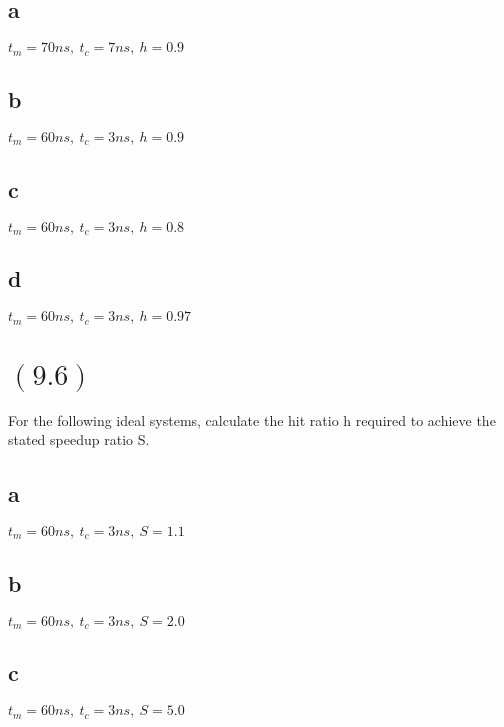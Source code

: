 \documentclass[letterpaper,12pt,titlepage]{article}
\begin{document}
\subsection*{a} $t_m=70ns,~t_c=7ns,~h=0.9$
\begin{mdframed}[style=MyFrame]
\end{mdframed}
\subsection*{b} $t_m=60ns,~t_c=3ns,~h=0.9$
\begin{mdframed}[style=MyFrame]
\end{mdframed}
\subsection*{c} $t_m=60ns,~t_c=3ns,~h=0.8$
\begin{mdframed}[style=MyFrame]
\end{mdframed}
\subsection*{d} $t_m=60ns,~t_c=3ns,~h=0.97$
\begin{mdframed}[style=MyFrame]
\end{mdframed}

\section*{$(9.6)$} For the following ideal systems, calculate the hit ratio h required to achieve the stated speedup ratio S.

\subsection*{a} $t_m=60ns,~t_c=3ns,~S=1.1$
\begin{mdframed}[style=MyFrame]
\end{mdframed}
\subsection*{b} $t_m=60ns,~t_c=3ns,~S=2.0$
\begin{mdframed}[style=MyFrame]
\end{mdframed}
\subsection*{c} $t_m=60ns,~t_c=3ns,~S=5.0$
\begin{mdframed}[style=MyFrame]
\end{mdframed}
\end{document}
